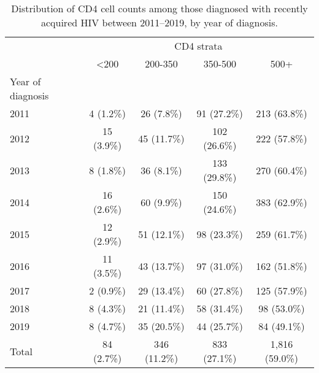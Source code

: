 \begin{table}[!h]
\centering\centering
\caption{\label{tab:cd4_dist_eey}Distribution of CD4 cell counts among those diagnosed with recently acquired HIV between 2011--2019, by year of diagnosis.}
\centering
\begin{tabular}[t]{lcccc}
\toprule
\multicolumn{1}{c}{ } & \multicolumn{4}{c}{CD4 strata} \\
\cmidrule(l{3pt}r{3pt}){2-5}
 & <200 & 200-350 & 350-500 & 500+\\
\midrule
Year of diagnosis &  &  &  & \\
\hspace{1em}2011 & 4 (1.2\%) & 26 (7.8\%) & 91 (27.2\%) & 213 (63.8\%)\\
\hspace{1em}2012 & 15 (3.9\%) & 45 (11.7\%) & 102 (26.6\%) & 222 (57.8\%)\\
\hspace{1em}2013 & 8 (1.8\%) & 36 (8.1\%) & 133 (29.8\%) & 270 (60.4\%)\\
\hspace{1em}2014 & 16 (2.6\%) & 60 (9.9\%) & 150 (24.6\%) & 383 (62.9\%)\\
\hspace{1em}2015 & 12 (2.9\%) & 51 (12.1\%) & 98 (23.3\%) & 259 (61.7\%)\\
\hspace{1em}2016 & 11 (3.5\%) & 43 (13.7\%) & 97 (31.0\%) & 162 (51.8\%)\\
\hspace{1em}2017 & 2 (0.9\%) & 29 (13.4\%) & 60 (27.8\%) & 125 (57.9\%)\\
\hspace{1em}2018 & 8 (4.3\%) & 21 (11.4\%) & 58 (31.4\%) & 98 (53.0\%)\\
\hspace{1em}2019 & 8 (4.7\%) & 35 (20.5\%) & 44 (25.7\%) & 84 (49.1\%)\\
Total & 84 (2.7\%) & 346 (11.2\%) & 833 (27.1\%) & 1,816 (59.0\%)\\
\bottomrule
\end{tabular}
\end{table}
